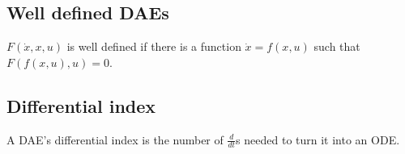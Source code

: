 \subsection{Well defined DAEs}

$F(\dot x, x, u)$ is well defined if there is a function $\dot{x}=f(x,u)$ such that\\ $F(f(x,u),u)=0$.




\subsection{Differential index}
A DAE's differential index is the number of $\frac{d}{dt}$s needed to turn it into an ODE.

